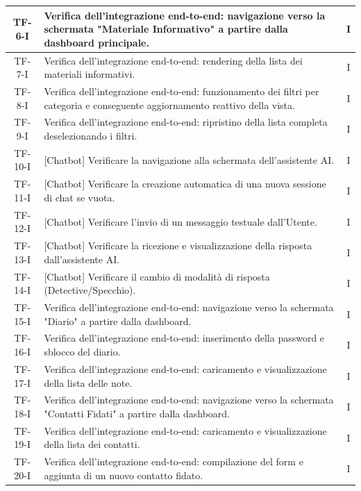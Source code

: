 \documentclass[a4paper,12pt]{article}
\begin{document}
\begin{longtable}{|c|p{10cm}|c|}
    TF-6-I & Verifica dell'integrazione end-to-end: navigazione verso la schermata "Materiale Informativo" a partire dalla dashboard principale. & I \\
    \hline
    TF-7-I & Verifica dell'integrazione end-to-end: rendering della lista dei materiali informativi. & I \\
    \hline
    TF-8-I & Verifica dell'integrazione end-to-end: funzionamento dei filtri per categoria e conseguente aggiornamento reattivo della vista. & I \\
    \hline
    TF-9-I & Verifica dell'integrazione end-to-end: ripristino della lista completa deselezionando i filtri. & I \\
    \hline
    TF-10-I & [Chatbot] Verificare la navigazione alla schermata dell'assistente AI. & I \\
    \hline
    TF-11-I & [Chatbot] Verificare la creazione automatica di una nuova sessione di chat se vuota. & I \\
    \hline
    TF-12-I & [Chatbot] Verificare l'invio di un messaggio testuale dall'Utente. & I \\
    \hline
    TF-13-I & [Chatbot] Verificare la ricezione e visualizzazione della risposta dall'assistente AI. & I \\
    \hline
    TF-14-I & [Chatbot] Verificare il cambio di modalità di risposta (Detective/Specchio). & I \\
    \hline
    TF-15-I & Verifica dell'integrazione end-to-end: navigazione verso la schermata "Diario" a partire dalla dashboard. & I \\
    \hline
    TF-16-I & Verifica dell'integrazione end-to-end: inserimento della password e sblocco del diario. & I \\
    \hline
    TF-17-I & Verifica dell'integrazione end-to-end: caricamento e visualizzazione della lista delle note. & I \\
    \hline
    TF-18-I & Verifica dell'integrazione end-to-end: navigazione verso la schermata "Contatti Fidati" a partire dalla dashboard. & I \\
    \hline
    TF-19-I & Verifica dell'integrazione end-to-end: caricamento e visualizzazione della lista dei contatti. & I \\
    \hline
    TF-20-I & Verifica dell'integrazione end-to-end: compilazione del form e aggiunta di un nuovo contatto fidato. & I \\
    \hline

\end{longtable}
\end{document}
